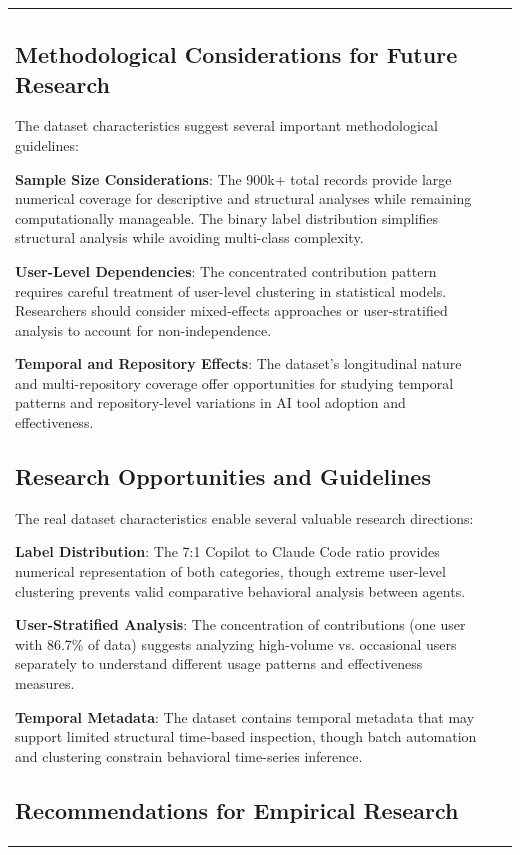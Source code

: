 \documentclass[conference]{IEEEtran}
\begin{document}
\begin{table}[t]
\begin{tabular}{@{}lrr@{}}
\subsection{Methodological Considerations for Future Research}

The dataset characteristics suggest several important methodological guidelines:

\textbf{Sample Size Considerations}: The 900k+ total records provide large numerical coverage for descriptive and structural analyses while remaining computationally manageable. The binary label distribution simplifies structural analysis while avoiding multi-class complexity.

\textbf{User-Level Dependencies}: The concentrated contribution pattern requires careful treatment of user-level clustering in statistical models. Researchers should consider mixed-effects approaches or user-stratified analysis to account for non-independence.

\textbf{Temporal and Repository Effects}: The dataset's longitudinal nature and multi-repository coverage offer opportunities for studying temporal patterns and repository-level variations in AI tool adoption and effectiveness.

\subsection{Research Opportunities and Guidelines}

The real dataset characteristics enable several valuable research directions:

\textbf{Label Distribution}: The 7:1 Copilot to Claude Code ratio provides numerical representation of both categories, though extreme user-level clustering prevents valid comparative behavioral analysis between agents.

\textbf{User-Stratified Analysis}: The concentration of contributions (one user with 86.7\% of data) suggests analyzing high-volume vs. occasional users separately to understand different usage patterns and effectiveness measures.

\textbf{Temporal Metadata}: The dataset contains temporal metadata that may support limited structural time-based inspection, though batch automation and clustering constrain behavioral time-series inference.

\subsection{Recommendations for Empirical Research}


\end{tabular}
\end{table}
\end{document}
